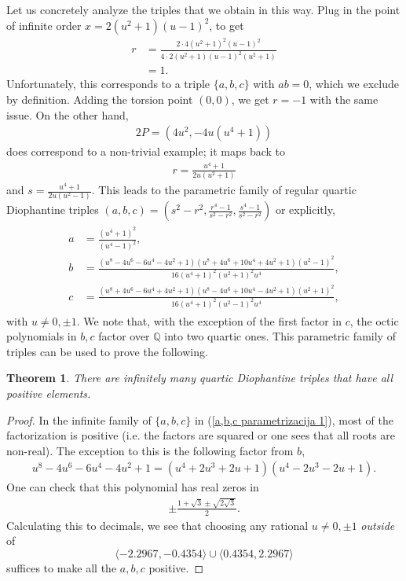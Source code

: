 \documentclass{amsart}
\newtheorem{theorem}{Theorem}
\begin{document}
Let us concretely analyze the triples that we obtain in this way.
Plug in the point of infinite order $x = 2(u^2+1)(u-1)^2$, to get
\begin{align*}
    r &= \frac{2  \cdot 4(u^2+1)^2(u-1)^2}{4\cdot 2(u^2+1)(u-1)^2(u^2+1)}\\
    &= 1.
\end{align*} Unfortunately, this corresponds to a triple $\{a,b,c\}$ with $ab=0$, which we exclude by definition.
Adding the torsion point $(0,0)$, we get $r=-1$ with the same issue.
On the other hand,
\begin{align*}
    2P = (4u^2, -4u(u^4+1))
\end{align*}
does correspond to a non-trivial example; it maps back to
\begin{align*}
    r = \frac{u^4+1}{2u(u^2+1)}
\end{align*} and $s=\frac{u^4+1}{2u(u^2-1)}$.
This leads to the parametric family of regular quartic Diophantine triples $(a,b,c)=\left(s^2-r^2,\frac{r^4-1}{s^2-r^2}, \frac{s^4-1}{s^2-r^2}\right)$ or explicitly,
\begin{align} \label{a,b,c parametrizacija 1}
    \begin{split}
    a &= \frac{(u^4 + 1)^2}{(u^4 - 1)^2}, \\
    b &= \frac{(u^8 - 4u^6 - 6u^4 - 4u^2 + 1)(u^8 + 4u^6 + 10u^4 + 4u^2 + 1)(u^2 - 1)^2}{16(u^4 + 1)^2(u^2 + 1)^2u^4},\\
    c &= \frac{(u^8 + 4u^6 - 6u^4 + 4u^2 + 1)(u^8 - 4u^6 + 10u^4 - 4u^2 + 1)(u^2 + 1)^2}{16(u^4 + 1)^2(u^2 -1)^2u^4},
    \end{split}
\end{align}
with $u\neq 0, \pm 1$.
We note that, with the exception of the first factor in $c$,
the octic polynomials in $b,c$ factor over $\mathbb{Q}$ into two quartic ones.
This parametric family of triples can be used to prove the following.
\begin{theorem} \label{inftly many positive triples}
    There are infinitely many quartic Diophantine triples that have all positive elements.
\end{theorem}
\begin{proof} In the infinite family of $\{a,b,c\}$ in (\ref{a,b,c parametrizacija 1}), most of the factorization is positive (i.e. the factors are squared or one sees that all roots are non-real). The exception to this is the following factor from $b$,
\begin{align*}
    u^8 - 4u^6 - 6u^4 - 4u^2 + 1 = (u^4 + 2u^3 + 2u + 1)(u^4 - 2u^3 - 2u + 1).
\end{align*}
One can check that this polynomial has real zeros in
\begin{align*}
     \pm\frac{1+\sqrt{3}\pm\sqrt{2\sqrt{3}}}{2}.
\end{align*}
Calculating this to decimals, we see that choosing any rational $u\neq 0,\pm 1$ \emph{outside} of $$\langle -2.2967,-0.4354\rangle \cup \langle 0.4354, 2.2967\rangle$$ suffices to make all the $a,b,c$ positive.
\end{proof}
\end{document}
